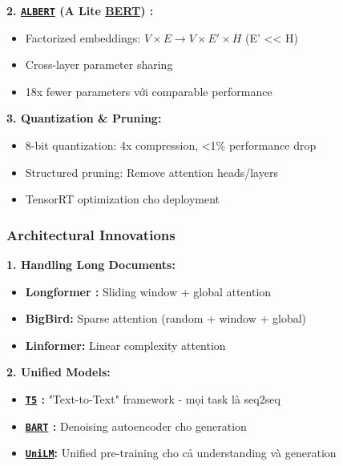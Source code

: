     \textbf{2. \hyperref[acro:albert]{\texttt{ALBERT}} (A Lite \hyperref[acro:bert]{\textbf{BERT}}) \cite{lan2019albert}:}
    \begin{itemize}
        \item Factorized embeddings: $V \times E \rightarrow V \times E' \times H$ (E' << H)
        \item Cross-layer parameter sharing
        \item 18x fewer parameters với comparable performance
    \end{itemize}
    
    \textbf{3. Quantization \& Pruning:}
    \begin{itemize}
        \item 8-bit quantization: 4x compression, <1\% performance drop
        \item Structured pruning: Remove attention heads/layers
        \item TensorRT optimization cho deployment
    \end{itemize}
    
    \subsubsection{Architectural Innovations}
    
    \textbf{1. Handling Long Documents:}
    \begin{itemize}
        \item \textbf{Longformer \cite{beltagy2020longformer}:} Sliding window + global attention
        \item \textbf{BigBird:} Sparse attention (random + window + global)
        \item \textbf{Linformer:} Linear complexity attention
    \end{itemize}
    
    \textbf{2. Unified Models:}
    \begin{itemize}
        \item \textbf{\hyperref[acro:t5]{\texttt{T5}} \cite{raffel2020exploring}:} "Text-to-Text" framework - mọi task là seq2seq
        \item \textbf{\hyperref[acro:bart]{\texttt{BART}} \cite{lewis2019bart}:} Denoising autoencoder cho generation
        \item \textbf{\hyperref[acro:unilm]{\texttt{UniLM}}:} Unified pre-training cho cả understanding và generation
    \end{itemize}
    
